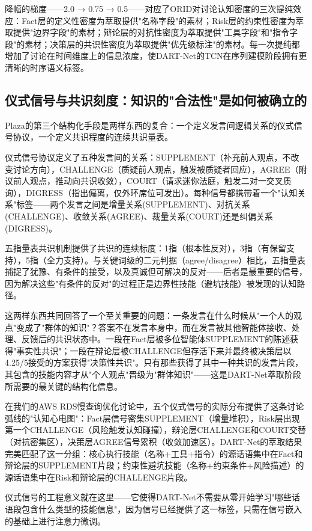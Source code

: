 \documentclass[twocolumn,10.5pt]{ctexart}
\begin{document}
降幅的梯度——2.0 → 0.75 → 0.5——对应了ORID对讨论认知密度的三次提纯效应：Fact层的定义性密度为萃取提供"名称字段"的素材；Risk层的约束性密度为萃取提供"边界字段"的素材；辩论层的对抗性密度为萃取提供"工具字段"和"指令字段"的素材；决策层的共识性密度为萃取提供"优先级标注"的素材。每一次提纯都增加了讨论在时间维度上的信息浓度，使DART-Net的TCN在序列建模阶段拥有更清晰的时序语义标签。

\subsection{仪式信号与共识刻度：知识的"合法性"是如何被确立的}

Plaza的第三个结构化手段是两样东西的复合：一个定义发言间逻辑关系的仪式信号协议，一个定义共识程度的连续共识量表。

仪式信号协议定义了五种发言间的关系：SUPPLEMENT（补充前人观点，不改变讨论方向），CHALLENGE（质疑前人观点，触发被质疑者回应），AGREE（附议前人观点，推动向共识收敛），COURT（请求迷你法庭，触发二对一交叉质询），DIGRESS（指出偏离，仅外环席位可发出）。每种信号都携带着一个"认知关系"标签——两个发言之间是增量关系(SUPPLEMENT)、对抗关系(CHALLENGE)、收敛关系(AGREE)、裁量关系(COURT)还是纠偏关系(DIGRESS)。

五指量表共识机制提供了共识的连续标度：1指（根本性反对），3指（有保留支持），5指（全力支持）。与关键词级的二元判据（agree/disagree）相比，五指量表捕捉了犹豫、有条件的接受，以及真诚但可解决的反对——后者是最重要的信号，因为解决这些"有条件的反对"的过程正是边界性技能（避坑技能）被发现的认知路径。

这两样东西共同回答了一个至关重要的问题：一条发言在什么时候从"一个人的观点"变成了"群体的知识"？答案不在发言本身中，而在发言被其他智能体接收、处理、反馈后的共识状态中。一段在Fact层被多位智能体SUPPLEMENT的陈述获得"事实性共识"；一段在辩论层被CHALLENGE但存活下来并最终被决策层以4.25/5接受的方案获得"决策性共识"。只有那些获得了其中一种共识的发言片段，其包含的技能内容才从"个人观点"晋级为"群体知识"——这是DART-Net萃取阶段所需要的最关键的结构化信息。

在我们的AWS RDS慢查询优化讨论中，五个仪式信号的实际分布提供了这条讨论弧线的"认知心电图"：Fact层信号密集SUPPLEMENT（增量堆积），Risk层出现第一个CHALLENGE（风险触发认知碰撞），辩论层CHALLENGE和COURT交替（对抗密集区），决策层AGREE信号累积（收敛加速区）。DART-Net的萃取结果完美匹配了这一分组：核心执行技能（名称+工具+指令）的源话语集中在Fact和辩论层的SUPPLEMENT片段；约束性避坑技能（名称+约束条件+风险描述）的源话语集中在Risk和辩论层的CHALLENGE片段。

仪式信号的工程意义就在这里——它使得DART-Net不需要从零开始学习"哪些话语段包含什么类型的技能信息"，因为信号已经提供了这一标签，只需在信号嵌入的基础上进行注意力微调。
\end{document}
